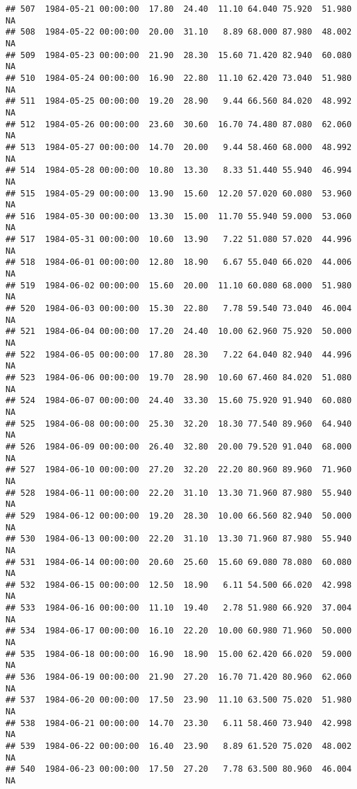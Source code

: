 \documentclass{article}\usepackage{graphicx, color}
\makeatletter
\newenvironment{kframe}{%
 \def\at@end@of@kframe{}%
 \ifinner\ifhmode%
  \def\at@end@of@kframe{\end{minipage}}%
  \begin{minipage}{\columnwidth}%
 \fi\fi%
 \def\FrameCommand##1{\hskip\@totalleftmargin \hskip-\fboxsep
 \colorbox{shadecolor}{##1}\hskip-\fboxsep
     \hskip-\linewidth \hskip-\@totalleftmargin \hskip\columnwidth}%
 \MakeFramed {\advance\hsize-\width
   \@totalleftmargin\z@ \linewidth\hsize
   \@setminipage}}%
 {\par\unskip\endMakeFramed%
 \at@end@of@kframe}
\newenvironment{knitrout}{}{} %
\makeatother
\begin{document}
\begin{knitrout}
\begin{kframe}
\begin{verbatim}
## 507  1984-05-21 00:00:00  17.80  24.40  11.10 64.040 75.920  51.980     NA
## 508  1984-05-22 00:00:00  20.00  31.10   8.89 68.000 87.980  48.002     NA
## 509  1984-05-23 00:00:00  21.90  28.30  15.60 71.420 82.940  60.080     NA
## 510  1984-05-24 00:00:00  16.90  22.80  11.10 62.420 73.040  51.980     NA
## 511  1984-05-25 00:00:00  19.20  28.90   9.44 66.560 84.020  48.992     NA
## 512  1984-05-26 00:00:00  23.60  30.60  16.70 74.480 87.080  62.060     NA
## 513  1984-05-27 00:00:00  14.70  20.00   9.44 58.460 68.000  48.992     NA
## 514  1984-05-28 00:00:00  10.80  13.30   8.33 51.440 55.940  46.994     NA
## 515  1984-05-29 00:00:00  13.90  15.60  12.20 57.020 60.080  53.960     NA
## 516  1984-05-30 00:00:00  13.30  15.00  11.70 55.940 59.000  53.060     NA
## 517  1984-05-31 00:00:00  10.60  13.90   7.22 51.080 57.020  44.996     NA
## 518  1984-06-01 00:00:00  12.80  18.90   6.67 55.040 66.020  44.006     NA
## 519  1984-06-02 00:00:00  15.60  20.00  11.10 60.080 68.000  51.980     NA
## 520  1984-06-03 00:00:00  15.30  22.80   7.78 59.540 73.040  46.004     NA
## 521  1984-06-04 00:00:00  17.20  24.40  10.00 62.960 75.920  50.000     NA
## 522  1984-06-05 00:00:00  17.80  28.30   7.22 64.040 82.940  44.996     NA
## 523  1984-06-06 00:00:00  19.70  28.90  10.60 67.460 84.020  51.080     NA
## 524  1984-06-07 00:00:00  24.40  33.30  15.60 75.920 91.940  60.080     NA
## 525  1984-06-08 00:00:00  25.30  32.20  18.30 77.540 89.960  64.940     NA
## 526  1984-06-09 00:00:00  26.40  32.80  20.00 79.520 91.040  68.000     NA
## 527  1984-06-10 00:00:00  27.20  32.20  22.20 80.960 89.960  71.960     NA
## 528  1984-06-11 00:00:00  22.20  31.10  13.30 71.960 87.980  55.940     NA
## 529  1984-06-12 00:00:00  19.20  28.30  10.00 66.560 82.940  50.000     NA
## 530  1984-06-13 00:00:00  22.20  31.10  13.30 71.960 87.980  55.940     NA
## 531  1984-06-14 00:00:00  20.60  25.60  15.60 69.080 78.080  60.080     NA
## 532  1984-06-15 00:00:00  12.50  18.90   6.11 54.500 66.020  42.998     NA
## 533  1984-06-16 00:00:00  11.10  19.40   2.78 51.980 66.920  37.004     NA
## 534  1984-06-17 00:00:00  16.10  22.20  10.00 60.980 71.960  50.000     NA
## 535  1984-06-18 00:00:00  16.90  18.90  15.00 62.420 66.020  59.000     NA
## 536  1984-06-19 00:00:00  21.90  27.20  16.70 71.420 80.960  62.060     NA
## 537  1984-06-20 00:00:00  17.50  23.90  11.10 63.500 75.020  51.980     NA
## 538  1984-06-21 00:00:00  14.70  23.30   6.11 58.460 73.940  42.998     NA
## 539  1984-06-22 00:00:00  16.40  23.90   8.89 61.520 75.020  48.002     NA
## 540  1984-06-23 00:00:00  17.50  27.20   7.78 63.500 80.960  46.004     NA

\end{verbatim}
\end{kframe}
\end{knitrout}
\end{document}
